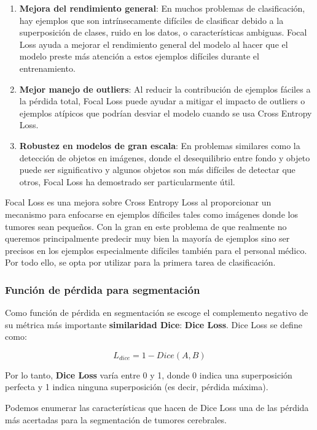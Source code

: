 \begin{enumerate}
	\item \textbf{Mejora del rendimiento general}: En muchos problemas de clasificación, hay ejemplos que son intrínsecamente difíciles de clasificar debido a la superposición de clases, ruido en los datos, o características ambiguas. Focal Loss ayuda a mejorar el rendimiento general del modelo al hacer que el modelo preste más atención a estos ejemplos difíciles durante el entrenamiento.
	
	\item \textbf{Mejor manejo de outliers}: Al reducir la contribución de ejemplos fáciles a la pérdida total, Focal Loss puede ayudar a mitigar el impacto de outliers o ejemplos atípicos que podrían desviar el modelo cuando se usa Cross Entropy Loss.
	
	\item \textbf{Robustez en modelos de gran escala}: En problemas similares como la detección de objetos en imágenes, donde el desequilibrio entre fondo y objeto puede ser significativo y algunos objetos son más difíciles de detectar que otros, Focal Loss ha demostrado ser particularmente útil.
	
\end{enumerate}

Focal Loss es una mejora sobre Cross Entropy Loss al proporcionar un mecanismo para enfocarse en ejemplos díficiles tales como imágenes donde los tumores sean pequeños. Con la gran en este problema de que realmente no queremos principalmente predecir muy bien la mayoría de ejemplos sino ser precisos en los ejemplos especialmente difíciles también para el personal médico. Por todo ello, se opta por utilizar  para la primera tarea de clasificación.

\subsubsection{Función de pérdida para segmentación}

Como función de pérdida en segmentación se escoge el complemento negativo de su métrica más importante \textbf{similaridad Dice}: \textbf{Dice Loss}. Dice Loss se define como:

$$ L_{dice} = 1 - Dice(A, B) $$

Por lo tanto,  \textbf{Dice Loss} varía entre 0 y 1, donde 0 indica una superposición perfecta y 1 indica ninguna superposición (es decir, pérdida máxima).

Podemos enumerar las características que hacen de Dice Loss una de las pérdida más acertadas para la segmentación de tumores cerebrales. 

